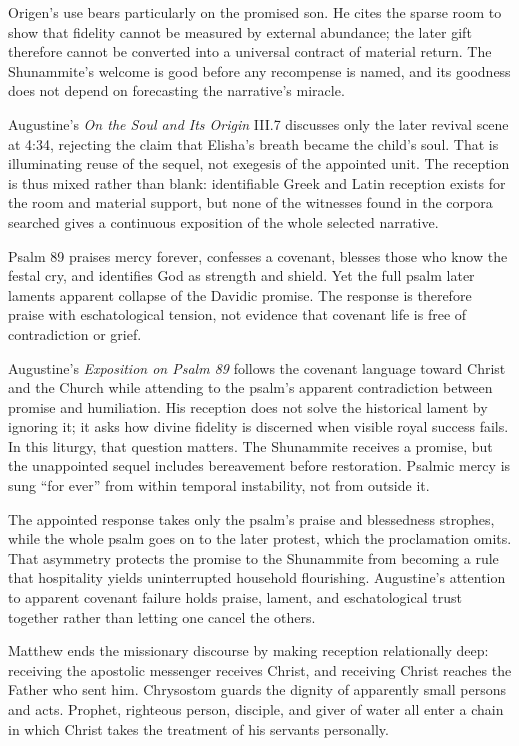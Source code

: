 Origen's use bears particularly on the promised son. He cites the sparse room to show that fidelity cannot be measured by external abundance; the later gift therefore cannot be converted into a universal contract of material return. The Shunammite's welcome is good before any recompense is named, and its goodness does not depend on forecasting the narrative's miracle.

Augustine's \emph{On the Soul and Its Origin} III.7 discusses only the later revival scene at 4:34, rejecting the claim that Elisha's breath became the child's soul. That is illuminating reuse of the sequel, not exegesis of the appointed unit. The reception is thus mixed rather than blank: identifiable Greek and Latin reception exists for the room and material support, but none of the witnesses found in the corpora searched gives a continuous exposition of the whole selected narrative.

Psalm 89 praises mercy forever, confesses a covenant, blesses those who know the festal cry, and identifies God as strength and shield. Yet the full psalm later laments apparent collapse of the Davidic promise. The response is therefore praise with eschatological tension, not evidence that covenant life is free of contradiction or grief.

Augustine's \emph{Exposition on Psalm 89} follows the covenant language toward Christ and the Church while attending to the psalm's apparent contradiction between promise and humiliation. His reception does not solve the historical lament by ignoring it; it asks how divine fidelity is discerned when visible royal success fails. In this liturgy, that question matters. The Shunammite receives a promise, but the unappointed sequel includes bereavement before restoration. Psalmic mercy is sung “for ever” from within temporal instability, not from outside it.

The appointed response takes only the psalm's praise and blessedness strophes, while the whole psalm goes on to the later protest, which the proclamation omits. That asymmetry protects the promise to the Shunammite from becoming a rule that hospitality yields uninterrupted household flourishing. Augustine's attention to apparent covenant failure holds praise, lament, and eschatological trust together rather than letting one cancel the others.

Matthew ends the missionary discourse by making reception relationally deep: receiving the apostolic messenger receives Christ, and receiving Christ reaches the Father who sent him. Chrysostom guards the dignity of apparently small persons and acts. Prophet, righteous person, disciple, and giver of water all enter a chain in which Christ takes the treatment of his servants personally.

